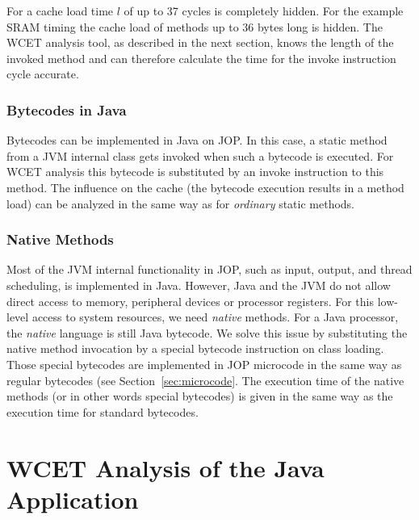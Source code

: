For  a cache load time $l$ of up to 37 cycles is
completely hidden. For the example SRAM timing the cache load of
methods up to 36 bytes long is hidden. The WCET analysis tool, as
described in the next section, knows the length of the invoked method
and can therefore calculate the time for the invoke instruction cycle
accurate.

\subsubsection{Bytecodes in Java}

Bytecodes can be implemented in Java on JOP. In this case, a static
method from a JVM internal class gets invoked when such a bytecode is
executed. For WCET analysis this bytecode is substituted by an invoke
instruction to this method. The influence on the cache (the bytecode
execution results in a method load) can be analyzed in the same way
as for \emph{ordinary} static methods.


\subsubsection{Native Methods}

Most of the JVM internal functionality in JOP, such as input, output,
and thread scheduling, is implemented in Java. However, Java and the
JVM do not allow direct access to memory, peripheral devices or
processor registers. For this low-level access to system resources,
we need \emph{native} methods. For a Java processor, the
\emph{native} language is still Java bytecode. We solve this issue by
substituting the native method invocation by a special bytecode
instruction on class loading. Those special bytecodes are implemented
in JOP microcode in the same way as regular bytecodes (see
Section~\ref{sec:microcode}. The execution time of the native methods
(or in other words special bytecodes) is given in the same way as the
execution time for standard bytecodes.

\section{WCET Analysis of the Java Application}
\label{sec:wcet:app} 

